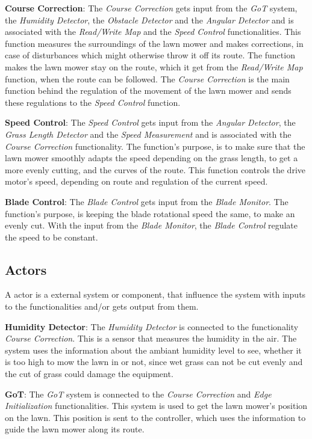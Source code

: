 \textbf{Course Correction}:
The \textit{Course Correction} gets input from the \textit{GoT} system, the \textit{Humidity Detector}, the \textit{Obstacle Detector} and the \textit{Angular Detector} and is associated with the \textit{Read/Write Map} and the \textit{Speed Control} functionalities. This function measures the surroundings of the lawn mower and makes corrections, in case of disturbances which might otherwise throw it off its route. The function makes the lawn mower stay on the route, which it get from the \textit{Read/Write Map} function, when the route can be followed. The \textit{Course Correction} is the main function behind the regulation of the movement of the lawn mower and sends these regulations to the \textit{Speed Control} function.

\textbf{Speed Control}:
The \textit{Speed Control} gets input from the \textit{Angular Detector}, the \textit{Grass Length Detector} and the \textit{Speed Measurement} and is associated with the \textit{Course Correction} functionality. The function's purpose, is to make sure that the lawn mower smoothly adapts the speed depending on the grass length, to get a more evenly cutting, and the curves of the route. This function controls the drive motor's speed, depending on route and regulation of the current speed.

\textbf{Blade Control}:
The \textit{Blade Control} gets input from the \textit{Blade Monitor}. The function's purpose, is keeping the blade rotational speed the same, to make an evenly cut. With the input from the \textit{Blade Monitor}, the \textit{Blade Control} regulate the speed to be constant.

\subsection{Actors}

A actor is a external system or component, that influence the system with inputs to the functionalities and/or gets output from them.

\textbf{Humidity Detector}:
The \textit{Humidity Detector} is connected to the functionality \textit{Course Correction}. This is a sensor that measures the humidity in the air. The system uses the information about the ambiant humidity level to see, whether it is too high to mow the lawn in or not, since wet grass can not be cut evenly and the cut of grass could damage the equipment. 

\textbf{GoT}:
The \textit{GoT} system is connected to the \textit{Course Correction} and \textit{Edge Initialization} functionalities. This system is used to get the lawn mower's position on the lawn. This position is sent to the controller, which uses the information to guide the lawn mower along its route.

